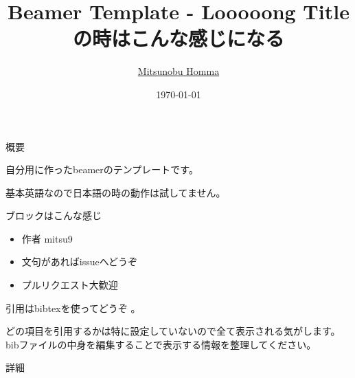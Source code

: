 \documentclass[11pt, uplatex, unicode, dvipdfmx]{beamer}
\title[]{Beamer Template - Looooong Titleの時はこんな感じになる}
\author[]{\underline{Mitsunobu Homma}} %
\date{\today}
\institute[]{Graduate School of Engineering, Soka University, Tokyo}
\begin{document}
\maketitle

\begin{frame}[t]{概要}

自分用に作ったbeamerのテンプレートです。

基本英語なので日本語の時の動作は試してません。

\begin{block}{ブロックはこんな感じ}
\begin{itemize}
\item 作者 mitsu9
\item 文句があればissueへどうぞ
\item プルリクエスト大歓迎
\end{itemize}
\end{block}

引用はbibtexを使ってどうぞ 。

どの項目を引用するかは特に設定していないので全て表示される気がします。bibファイルの中身を編集することで表示する情報を整理してください。
\end{frame}
\begin{frame}[t]{詳細}

\end{frame}
\end{document}
